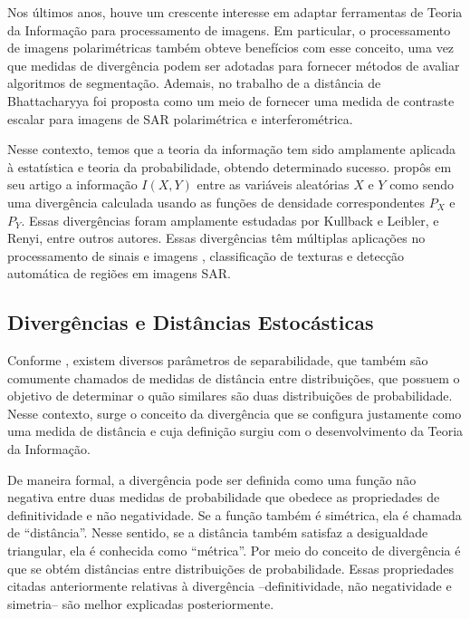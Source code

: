 Nos últimos anos, houve um crescente interesse em adaptar ferramentas de Teoria da Informação para processamento de imagens. 
Em particular, o processamento de imagens polarimétricas também obteve benefícios com esse conceito, uma vez que medidas de divergência podem ser adotadas para fornecer métodos de avaliar algoritmos de segmentação. 
Ademais, no trabalho de \citet{Goudail:04} a distância de Bhattacharyya foi proposta como um meio de fornecer uma medida de contraste escalar para imagens de SAR polarimétrica e interferométrica.

Nesse contexto, temos que a teoria da informação tem sido amplamente aplicada à estatística e teoria da probabilidade, obtendo determinado sucesso. 
\citet{Shannon48} propôs em seu artigo a informação $I(X,Y)$ entre as variáveis aleatórias $X$ e $Y$ como sendo uma divergência calculada usando as funções de densidade correspondentes $P_{X}$ e $P_{Y}$.
Essas divergências foram amplamente estudadas por Kullback e Leibler, e Renyi, entre outros autores. 
Essas divergências têm múltiplas aplicações no processamento de sinais e imagens \citep{Aviyente}, classificação de texturas e detecção automática de regiões em imagens SAR.

\subsection{Divergências e Distâncias Estocásticas}

Conforme \citet{tese_abraao}, existem diversos parâmetros de separabilidade, que também são comumente chamados de medidas de distância entre distribuições, que possuem o objetivo de determinar o quão similares são duas distribuições de probabilidade. 
Nesse contexto, surge o conceito da divergência que se configura justamente como uma medida de distância e cuja definição surgiu com o desenvolvimento da Teoria da Informação. 

De maneira formal, a divergência pode ser definida como uma função não negativa entre duas medidas de probabilidade que obedece as propriedades de definitividade e não negatividade. 
Se a função também é simétrica, ela é chamada de ``distância''. 
Nesse sentido, se a distância também satisfaz a desigualdade triangular, ela é conhecida como ``métrica''. 
Por meio do conceito de divergência é que se obtém distâncias entre distribuições de probabilidade. 
Essas propriedades citadas anteriormente relativas à divergência --definitividade, não negatividade e simetria-- são melhor explicadas posteriormente.

